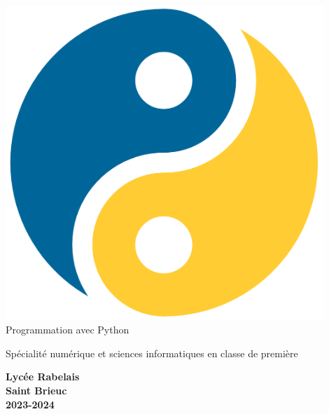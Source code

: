 \begin{titlepage}
    \begin{center}
        \includegraphics[width=12cm]{titlepage/img/yin_yang_python}\\[2em]

        {\bigtitlefont \large\color{gray} Programmation avec Python}

        {\titlefont\Large\color{gray} Spécialité numérique et sciences informatiques en classe de première\\[2em]}

        {\color{gray}\textbf{Lycée Rabelais\\ Saint Brieuc\\ 2023-2024}}
    \end{center}
\end{titlepage}